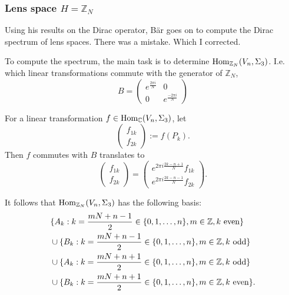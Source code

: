 \documentclass{beamer}
\def\C{{\mathbb C}}
\def\Z{{\mathbb Z}}
\def\Hom{{\rm Hom}}
\begin{document}
\begin{frame}
\frametitle{Lens space $H = \Z_N$}
\begin{block}{}
Using his results on the Dirac operator, B\"ar goes on to compute the Dirac spectrum of lens spaces. There was a mistake. Which I corrected.
\end{block}
\pause
\begin{block}{}
To compute the spectrum, the main task is to determine $\Hom_{\Z_N}(V_n, \Sigma_3)$. I.e. which linear transformations commute with the generator of $\Z_N$,
\[
B =
\left(
\begin{array}{cc}
e^{\frac{2 \pi i}{N}} & 0 \\
0 & e^{\frac{-2 \pi i}{N}}
\end{array}
\right)
\]
\end{block}
\end{frame}

\begin{frame}
For a linear transformation $f \in \Hom_{\C}(V_n, \Sigma_3)$, let
\[
\left(
\begin{array}{c}
f_{1k} \\
f_{2k}
\end{array}
\right)
:= f(P_k).
\]
Then $f$ commutes with $B$ translates to
\[
\left(
\begin{array}{c}
f_{1k} \\
f_{2k}
\end{array}
\right)
=
\left(
\begin{array}{c}
e^{2\pi i \frac{2k-n+1}{N}}f_{1k} \\
e^{2\pi i \frac{2k-n-1}{N}}f_{2k}
\end{array}
\right).
\]
\end{frame}

\begin{frame}
It follows that $\Hom _{\mathbb{Z}_N} (V_{n}, \Sigma_3)$  has the following basis:
\begin{align*}
& \{A_k : k = \frac{mN+n-1}{2} \in \{ 0,1,\ldots, n\}, m\in \Z,k \rm{~even} \} \\
& \cup \{B_k : k = \frac{mN+n-1}{2} \in \{ 0,1,\ldots, n\}, m\in \Z, k \rm{~odd} \} \\
& \cup \{A_k : k = \frac{mN+n+1}{2} \in \{ 0,1,\ldots, n\}, m\in \Z, k \rm{~odd} \} \\
& \cup \{B_k : k = \frac{mN+n+1}{2} \in \{ 0,1,\ldots, n\}, m\in \Z, k \rm{~even} \}. \\
\end{align*}
\end{frame}
\end{document}
